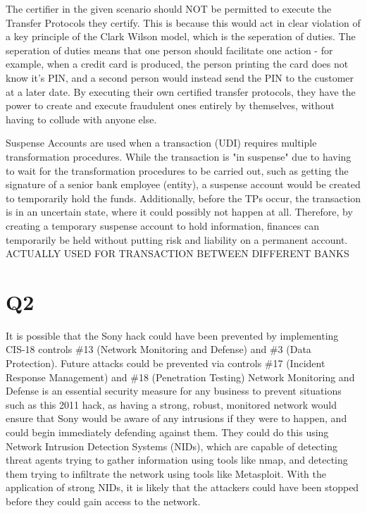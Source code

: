 \documentclass[12pt]{report}
\begin{document}
The certifier in the given scenario should NOT be permitted to execute the Transfer Protocols they certify. This is because this would act in clear violation of a key principle of the Clark Wilson model, which is the seperation of duties. The seperation of duties means that one person should facilitate one action - for example, when a credit card is produced, the person printing the card does not know it's PIN, and a second person would instead send the PIN to the customer at a later date. By executing their own certified transfer protocols, they have the power to create and execute fraudulent ones entirely by themselves, without having to collude with anyone else.


Suspense Accounts are used when a transaction (UDI) requires multiple transformation procedures. While the transaction is "in suspense" due to having to wait for the transformation procedures to be carried out, such as getting the signature of a senior bank employee (entity), a suspense account would be created to temporarily hold the funds. Additionally, before the TPs occur, the transaction is in an uncertain state, where it could possibly not happen at all. Therefore, by creating a temporary suspense account to hold information, finances can temporarily be held without putting risk and liability on a permanent account.
ACTUALLY USED FOR TRANSACTION BETWEEN DIFFERENT BANKS

\section{Q2}
It is possible that the Sony hack could have been prevented by implementing CIS-18 controls \#13 (Network Monitoring and Defense) and \#3 (Data Protection). Future attacks could be prevented via controls \#17 (Incident Response Management) and \#18 (Penetration Testing) Network Monitoring and Defense is an essential security measure for any business to prevent situations such as this 2011 hack, as having a strong, robust, monitored network would ensure that Sony would be aware of any intrusions if they were to happen, and could begin immediately defending against them. They could do this using Network Intrusion Detection Systems (NIDs), which are capable of detecting threat agents trying to gather information using tools like nmap, and detecting them trying to infiltrate the network using tools like Metasploit. With the application of strong NIDs, it is likely that the attackers could have been stopped before they could gain access to the network.
\end{document}
